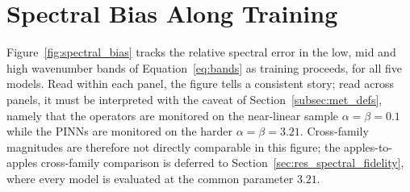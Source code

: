 \section{Spectral Bias Along Training}
\label{sec:res_spectral_bias}

Figure~\ref{fig:spectral_bias} tracks the relative spectral error in the low, mid and high wavenumber bands of Equation~\eqref{eq:bands} as training proceeds, for all five models. Read within each panel, the figure tells a consistent story; read across panels, it must be interpreted with the caveat of Section~\ref{subsec:met_defs}, namely that the operators are monitored on the near-linear sample $\alpha = \beta = 0.1$ while the PINNs are monitored on the harder $\alpha = \beta = 3.21$. Cross-family magnitudes are therefore not directly comparable in this figure; the apples-to-apples cross-family comparison is deferred to Section~\ref{sec:res_spectral_fidelity}, where every model is evaluated at the common parameter $3.21$.

